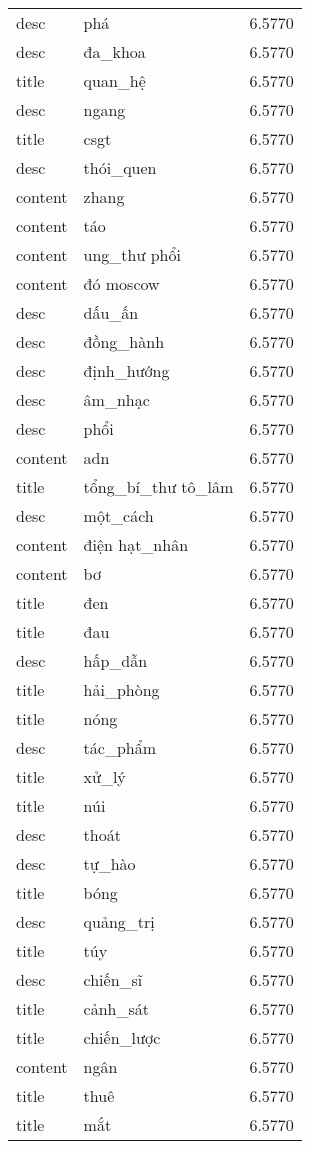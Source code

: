 \documentclass{article}
\begin{document}
\begin{tabular}{lll}
desc & phá & 6.5770\\
desc & đa\_khoa & 6.5770\\
title & quan\_hệ & 6.5770\\
desc & ngang & 6.5770\\
title & csgt & 6.5770\\
desc & thói\_quen & 6.5770\\
content & zhang & 6.5770\\
content & táo & 6.5770\\
content & ung\_thư phổi & 6.5770\\
content & đó moscow & 6.5770\\
desc & dấu\_ấn & 6.5770\\
desc & đồng\_hành & 6.5770\\
desc & định\_hướng & 6.5770\\
desc & âm\_nhạc & 6.5770\\
desc & phổi & 6.5770\\
content & adn & 6.5770\\
title & tổng\_bí\_thư tô\_lâm & 6.5770\\
desc & một\_cách & 6.5770\\
content & điện hạt\_nhân & 6.5770\\
content & bơ & 6.5770\\
title & đen & 6.5770\\
title & đau & 6.5770\\
desc & hấp\_dẫn & 6.5770\\
title & hải\_phòng & 6.5770\\
title & nóng & 6.5770\\
desc & tác\_phẩm & 6.5770\\
title & xử\_lý & 6.5770\\
title & núi & 6.5770\\
desc & thoát & 6.5770\\
desc & tự\_hào & 6.5770\\
title & bóng & 6.5770\\
desc & quảng\_trị & 6.5770\\
title & túy & 6.5770\\
desc & chiến\_sĩ & 6.5770\\
title & cảnh\_sát & 6.5770\\
title & chiến\_lược & 6.5770\\
content & ngân & 6.5770\\
title & thuê & 6.5770\\
title & mắt & 6.5770\\

\end{tabular}
\end{document}
